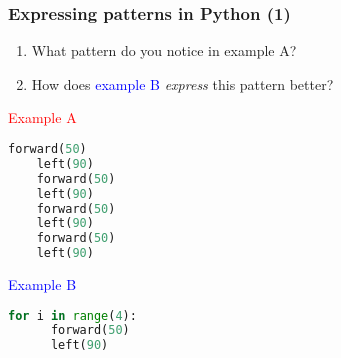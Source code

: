 \begin{frame}[fragile]
\frametitle<presentation>{Expressing patterns in Python (1)}
\begin{enumerate}
	\item What pattern do you notice in \alert{example A}?
	\item How does \textcolor{blue}{example B} \textit{express} this pattern better?

\end{enumerate}
	

\begin{minipage}[t]{0.45\textwidth}
	\textcolor{red}{Example A}
	\begin{lstlisting}[language=Python]
	forward(50)
	left(90)
	forward(50)
	left(90)
	forward(50)
	left(90)
	forward(50)
	left(90)
	\end{lstlisting}
\end{minipage}
\begin{minipage}[t]{0.45\textwidth}
	\textcolor{blue}{Example B}
	\begin{lstlisting}[language=Python]
	for i in range(4):
	  forward(50)
	  left(90)
	\end{lstlisting}
\end{minipage}

\note{}
\end{frame}

